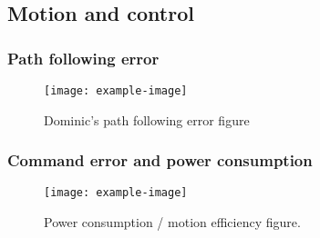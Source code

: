 \subsection{Motion and control}
\label{sec:res_motion}

\lightlipsum[1]

\subsubsection{Path following error}
\label{sec:cmd_error}

\lightlipsum[1]

\begin{figure} [htpb]
	\centering
	\texttt{[image: example-image]}
	\caption{Dominic's path following error figure}
	\label{fig:pf_error}
\end{figure}

\subsubsection{Command error and power consumption}
\label{sec:cmd_error}

\lightlipsum[1]

\begin{figure} [htpb]
	\centering
	\texttt{[image: example-image]}
	\caption{Power consumption / motion efficiency figure.}
	\label{fig:moiton_power}
\end{figure}